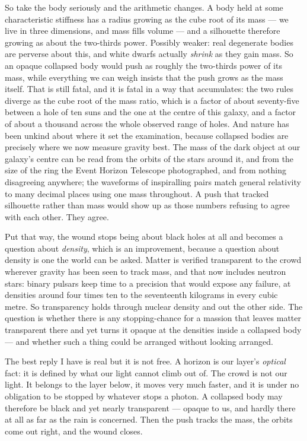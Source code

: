 So take the body seriously and the arithmetic changes. A body held at some characteristic stiffness has a radius growing as the cube root of its mass --- we live in three dimensions, and mass fills volume --- and a silhouette therefore growing as about the two-thirds power. Possibly weaker: real degenerate bodies are perverse about this, and white dwarfs actually \emph{shrink} as they gain mass. So an opaque collapsed body would push as roughly the two-thirds power of its mass, while everything we can weigh insists that the push grows as the mass itself. That is still fatal, and it is fatal in a way that accumulates: the two rules diverge as the cube root of the mass ratio, which is a factor of about seventy-five between a hole of ten suns and the one at the centre of this galaxy, and a factor of about a thousand across the whole observed range of holes. And nature has been unkind about where it set the examination, because collapsed bodies are precisely where we now measure gravity best. The mass of the dark object at our galaxy's centre can be read from the orbits of the stars around it, and from the size of the ring the Event Horizon Telescope photographed, and from nothing disagreeing anywhere; the waveforms of inspiralling pairs match general relativity to many decimal places using one mass throughout. A push that tracked silhouette rather than mass would show up as those numbers refusing to agree with each other. They agree.

Put that way, the wound stops being about black holes at all and becomes a question about \emph{density}, which is an improvement, because a question about density is one the world can be asked. Matter is verified transparent to the crowd wherever gravity has been seen to track mass, and that now includes neutron stars: binary pulsars keep time to a precision that would expose any failure, at densities around four times ten to the seventeenth kilograms in every cubic metre. So transparency holds through nuclear density and out the other side. The question is whether there is any stopping-chance for a massion that leaves matter transparent there and yet turns it opaque at the densities inside a collapsed body --- and whether such a thing could be arranged without looking arranged.

The best reply I have is real but it is not free. A horizon is our layer's \emph{optical} fact: it is defined by what our light cannot climb out of. The crowd is not our light. It belongs to the layer below, it moves very much faster, and it is under no obligation to be stopped by whatever stops a photon. A collapsed body may therefore be black and yet nearly transparent --- opaque to us, and hardly there at all as far as the rain is concerned. Then the push tracks the mass, the orbits come out right, and the wound closes.

